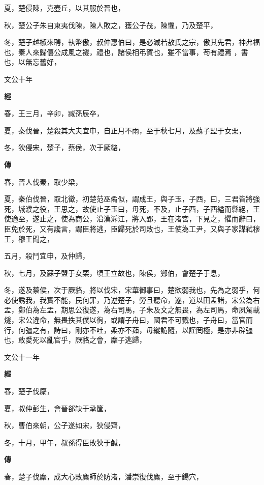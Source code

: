 \documentclass{ctexart}
\begin{document}
夏，楚侵陳，克壺丘，以其服於晉也，

秋，楚公子朱自東夷伐陳，陳人敗之，獲公子茷，陳懼，乃及楚平，

冬，楚子越椒來聘，執幣傲，叔仲惠伯曰，是必滅若敖氏之宗，傲其先君，神弗福也，秦人來歸僖公成風之襚，禮也，諸侯相弔賀也，雖不當事，苟有禮焉 ，書也，以無忘舊好，





文公十年


\textbf{經}



春，王三月，辛卯，臧孫辰卒，

夏，秦伐晉，楚殺其大夫宜申，自正月不雨，至于秋七月，及蘇子盟于女栗，

冬，狄侵宋，楚子，蔡侯，次于厥貉，

\textbf{傳}



春，晉人伐秦，取少梁，

夏，秦伯伐晉，取北徵，初楚范巫矞似，謂成王，與子玉，子西，曰，三君皆將強死，城濮之役，王思之，故使止子玉曰，毋死，不及，止子西，子西縊而縣絕，王使適至，遂止之，使為商公，沿漢泝江，將入郢，王在渚宮，下見之，懼而辭曰，臣免於死，又有讒言，謂臣將逃，臣歸死於司敗也，王使為工尹，又與子家謀弒穆王，穆王聞之，

五月，殺鬥宜申，及仲歸，

秋，七月，及蘇子盟于女栗，頃王立故也，陳侯，鄭伯，會楚子于息，

冬，遂及蔡侯，次于厥貉，將以伐宋，宋華御事曰，楚欲弱我也，先為之弱乎，何必使誘我，我實不能，民何罪，乃逆楚子，勞且聽命，遂，道以田孟諸，宋公為右盂，鄭伯為左盂，期思公復遂，為右司馬，子朱及文之無畏，為左司馬，命夙駕載燧，宋公違命，無畏抶其僕以徇，或謂子舟曰，國君不可戮也，子舟曰，當官而行，何彊之有，詩曰，剛亦不吐，柔亦不茹，毋縱詭隨，以謹罔極，是亦非辟彊也，敢愛死以亂官乎，厥貉之會，麇子逃歸，





文公十一年


\textbf{經}



春，楚子伐麇，

夏，叔仲彭生，會晉郤缺于承筐，

秋，曹伯來朝，公子遂如宋，狄侵齊，

冬，十月，甲午，叔孫得臣敗狄于鹹，

\textbf{傳}



春，楚子伐麇，成大心敗麇師於防渚，潘崇復伐麇，至于鍚穴，
\end{document}
